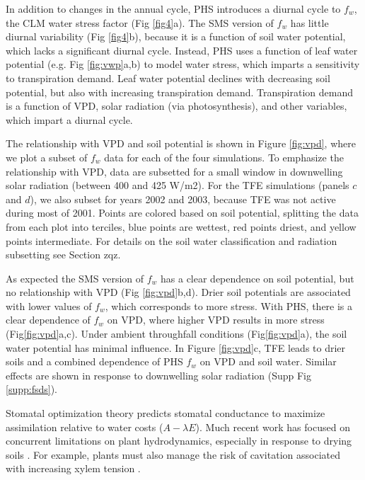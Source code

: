 \documentclass[draft,linenumbers]{agujournal}
\begin{document}
In addition to changes in the annual cycle, PHS introduces a diurnal cycle to $f_w$, the CLM water stress factor (Fig \ref{fig4}a). 
The SMS version of $f_w$ has little diurnal variability (Fig \ref{fig4}b), because it is a function of soil water potential, which lacks a significant diurnal cycle.
Instead, PHS uses a function of leaf water potential (e.g. Fig \ref{fig:vwp}a,b) to model water stress, which imparts a sensitivity to transpiration demand.
Leaf water potential declines with decreasing soil potential, but also with increasing transpiration demand.
Transpiration demand is a function of VPD, solar radiation (via photosynthesis), and other variables, which impart a diurnal cycle.

The relationship with VPD and soil potential is shown in Figure \ref{fig:vpd}, where we plot a subset of $f_w$ data for each of the four simulations. 
To emphasize the relationship with VPD, data are subsetted for a small window in downwelling solar radiation (between 400 and 425 W/m2).
For the TFE simulations (panels $c$ and $d$), we also subset for years 2002 and 2003, because TFE was not active during most of 2001.
Points are colored based on soil potential, splitting the data from each plot into terciles, blue points are wettest, red points driest, and yellow points intermediate.
For details on the soil water classification and radiation subsetting see Section zqz.

As expected the SMS version of $f_w$ has a clear dependence on soil potential, but no relationship with VPD (Fig \ref{fig:vpd}b,d). 
Drier soil potentials are associated with lower values of $f_w$, which corresponds to more stress.
With PHS, there is a clear dependence of $f_w$ on VPD, where higher VPD results in more stress (Fig\ref{fig:vpd}a,c).
Under ambient throughfall conditions (Fig\ref{fig:vpd}a), the soil water potential has minimal influence.
In Figure \ref{fig:vpd}c, TFE leads to drier soils and a combined dependence of PHS $f_w$ on VPD and soil water.
Similar effects are shown in response to downwelling solar radiation (Supp Fig \ref{supp:fsds}).

Stomatal optimization theory predicts stomatal conductance to maximize assimilation relative to water costs ($A-\lambda E$).
Much recent work has focused on concurrent limitations on plant hydrodynamics, especially in response to drying soils \citep{manzoni2013b,novick2016a,zhou2014}.
For example, plants must also manage the risk of cavitation associated with increasing xylem tension \citep{sperry1998}.
\end{document}
